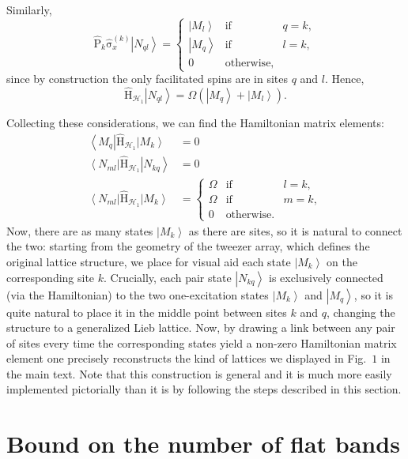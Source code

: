 \documentclass[prl,aps,twocolumn,showpacs,superscriptaddress,longbibliography]{revtex4-1}
\newcommand{\be}{\begin{equation}}
\newcommand{\ee}{\end{equation}}
\newcommand{\sysb}{\left\{\begin{array}}
\newcommand{\syse}{\end{array}\right.}
\newcommand{\mal}{\mathcal}
\newcommand{\lt}{\left(}
\newcommand{\rt}{\right)}
\newcommand{\lan}{\left\langle}
\newcommand{\ran}{\right\rangle}
\newcommand{\ket}[1]{\left| #1 \ran}
\newcommand{\bra}[1]{\lan #1 \right|}
\newcommand{\op}[1]{\mathrm{\hat{#1}}}
\begin{document}
Similarly, 
\be
	\op{P}_k \op{\sigma}_x^{(k)} \ket{N_{ql}} = \sysb{lcc} \ket{M_l} & \text{if} & q = k,  \\
													\ket{M_q} & \text{if} & l=k, \\													0 & \text{otherwise}, & \  \syse 
\ee
since by construction the only facilitated spins are in sites $q$ and $l$. Hence,
\be
	\op{H}_{\mal{H}_1} \ket{N_{ql}} = \Omega \lt \ket{M_q} + \ket{M_l} \rt.
\ee

Collecting these considerations, we can find the Hamiltonian matrix elements:
\begin{subequations}
\begin{align}
	\bra{M_q} \op{H}_{\mal{H}_1} \ket{M_k} &= 0 \label{eq:mat_elem1}\\
	\bra{N_{ml}} \op{H}_{\mal{H}_1} \ket{N_{kq}} & = 0 \\
	\bra{N_{ml}} \op{H}_{\mal{H}_1} \ket{M_k} &= \sysb{lcc} \Omega & \text{if} & l = k,  \\
													\Omega & \text{if} & m=k, \\													0 & \text{otherwise}. & \  \syse 
													\label{eq:mat_elem3}
\end{align}
\end{subequations}
Now, there are as many states $\ket{M_k}$ as there are sites, so it is natural to connect the two: starting from the geometry of the tweezer array, which defines the original lattice structure, we place for visual aid each state $\ket{M_k}$ on the corresponding site $k$. Crucially, each pair state $\ket{N_{kq}}$ is exclusively connected (via the Hamiltonian) to the two one-excitation states $\ket{M_k}$ and $\ket{M_q}$, so it is quite natural to place it in the middle point between sites $k$ and $q$, changing the structure to a generalized Lieb lattice. Now, by drawing a link between any pair of sites every time the corresponding states yield a non-zero Hamiltonian matrix element one precisely reconstructs the kind of lattices we displayed in Fig.~$1$ in the main text. Note that this construction is general and it is much more easily implemented pictorially than it is by following the steps described in this section.



\section{Bound on the number of flat bands}
\end{document}
